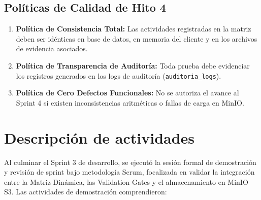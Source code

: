 \documentclass[12pt,a4paper]{article}
\begin{document}
\subsection{Políticas de Calidad de Hito 4}
\begin{enumerate}[leftmargin=1.5em, itemsep=2pt]
    \item \textbf{Política de Consistencia Total:} Las actividades registradas en la matriz deben ser idénticas en base de datos, en memoria del cliente y en los archivos de evidencia asociados.
    \item \textbf{Política de Transparencia de Auditoría:} Toda prueba debe evidenciar los registros generados en los logs de auditoría (\texttt{auditoria\_\allowbreak  logs}).
    \item \textbf{Política de Cero Defectos Funcionales:} No se autoriza el avance al Sprint 4 si existen inconsistencias aritméticas o fallas de carga en MinIO.
\end{enumerate}

\section{Descripción de actividades}
Al culminar el Sprint 3 de desarrollo, se ejecutó la sesión formal de demostración y revisión de sprint bajo metodología Scrum, focalizada en validar la integración entre la Matriz Dinámica, las Validation Gates y el almacenamiento en MinIO S3. Las actividades de demostración comprendieron:
\end{document}
